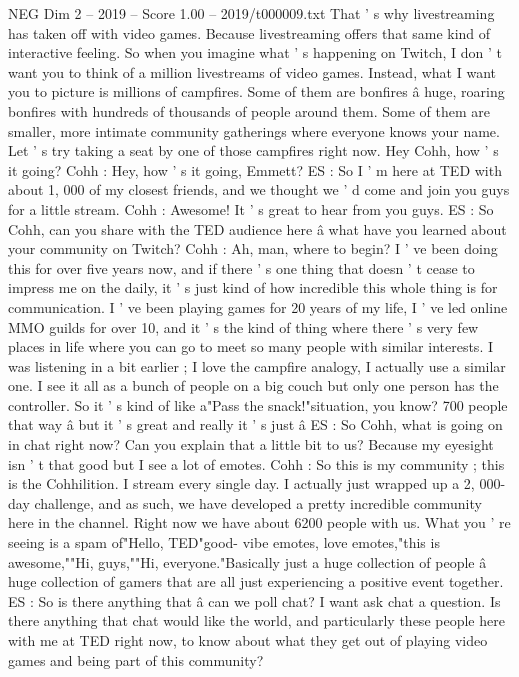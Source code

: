 \begin{textsample}{NEG Dim 2 – 2019 – Score 1.00 – 2019/t000009.txt}
That ' s why livestreaming has taken off with video games.
Because livestreaming offers that same kind of interactive feeling.
So when you imagine what ' s happening on Twitch, I don ' t want you to think of a million livestreams of video games.
Instead, what I want you to picture is millions of campfires.
Some of them are bonfires â huge, roaring bonfires with hundreds of thousands of people around them.
Some of them are smaller, more intimate community gatherings where everyone knows your name.
Let ' s try taking a seat by one of those campfires right now.
Hey Cohh, how ' s it going?
Cohh : Hey, how ' s it going, Emmett?
ES : So I ' m here at TED with about 1, 000 of my closest friends, and we thought we ' d come and join you guys for a little stream.
Cohh : Awesome!
It ' s great to hear from you guys.
ES : So Cohh, can you share with the TED audience here â what have you learned about your community on Twitch?
Cohh : Ah, man, where to begin?
I ' ve been doing this for over five years now, and if there ' s one thing that doesn ' t cease to impress me on the daily, it ' s just kind of how incredible this whole thing is for communication.
I ' ve been playing games for 20 years of my life, I ' ve led online MMO guilds for over 10, and it ' s the kind of thing where there ' s very few places in life where you can go to meet so many people with similar interests.
I was listening in a bit earlier ; I love the campfire analogy, I actually use a similar one.
I see it all as a bunch of people on a big couch but only one person has the controller.
So it ' s kind of like a"Pass the snack!"situation, you know? 700 people that way â but it ' s great and really it ' s just â ES : So Cohh, what is going on in chat right now?
Can you explain that a little bit to us?
Because my eyesight isn ' t that good but I see a lot of emotes.
Cohh : So this is my community ; this is the Cohhilition.
I stream every single day.
I actually just wrapped up a 2, 000-day challenge, and as such, we have developed a pretty incredible community here in the channel.
Right now we have about 6200 people with us.
What you ' re seeing is a spam of"Hello, TED"good- vibe emotes, love emotes,"this is awesome,""Hi, guys,""Hi, everyone."Basically just a huge collection of people â huge collection of gamers that are all just experiencing a positive event together.
ES : So is there anything that â can we poll chat?
I want ask chat a question.
Is there anything that chat would like the world, and particularly these people here with me at TED right now, to know about what they get out of playing video games and being part of this community?

\end{textsample}
